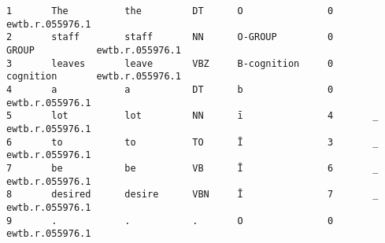 \documentclass[11pt]{article}
\begin{document}
\begin{figure*}
\begin{verbatim}
1       The          the         DT      O               0                               ewtb.r.055976.1
2       staff        staff       NN      O-GROUP         0               GROUP           ewtb.r.055976.1
3       leaves       leave       VBZ     B-cognition     0               cognition       ewtb.r.055976.1
4       a            a           DT      b               0                               ewtb.r.055976.1
5       lot          lot         NN      ī               4       _                       ewtb.r.055976.1
6       to           to          TO      Ī               3       _                       ewtb.r.055976.1
7       be           be          VB      Ī               6       _                       ewtb.r.055976.1
8       desired      desire      VBN     Ī               7       _                       ewtb.r.055976.1
9       .            .           .       O               0                               ewtb.r.055976.1


\end{verbatim}
\end{figure*}
\end{document}
